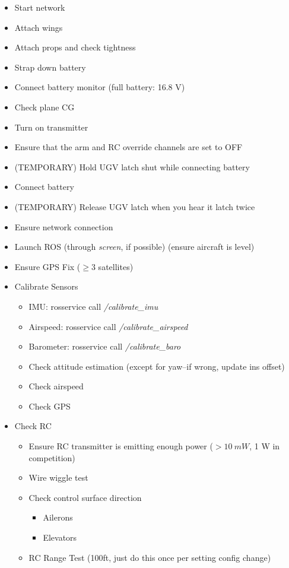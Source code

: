 \documentclass[]{auvsi_doc}
\begin{document}
\begin{itemize}
	\item Start network
	\item Attach wings%
	\item Attach props and check tightness
	\item Strap down battery
	\item Connect battery monitor (full battery: 16.8 V)
	\item Check plane CG
	\item Turn on transmitter
	\item Ensure that the arm and RC override channels are set to OFF
	\item (TEMPORARY) Hold UGV latch shut while connecting battery
	\item Connect battery
	\item (TEMPORARY) Release UGV latch when you hear it latch twice
	\item Ensure network connection
	\item Launch ROS (through \textit{screen}, if possible) (ensure aircraft is level)
	\item Ensure GPS Fix ($\geq 3$ satellites)
	\item Calibrate Sensors
	\begin{itemize}
		\item IMU: rosservice call \textit{/calibrate\_imu}
		\item Airspeed: rosservice call \textit{/calibrate\_airspeed}
		\item Barometer: rosservice call \textit{/calibrate\_baro}
		\item Check attitude estimation (except for yaw--if wrong, update ins offset)
		\item Check airspeed
		\item Check GPS
	\end{itemize}
	\item Check RC
	\begin{itemize}
		\item Ensure RC transmitter is emitting enough power ($>10~mW$, 1 W in competition)
		\item Wire wiggle test
		\item Check control surface direction
		\begin{itemize}
			\item Ailerons
			\item Elevators
		\end{itemize}
		\item RC Range Test (100ft, just do this once per setting config change)

\end{itemize}
\end{itemize}
\end{document}
